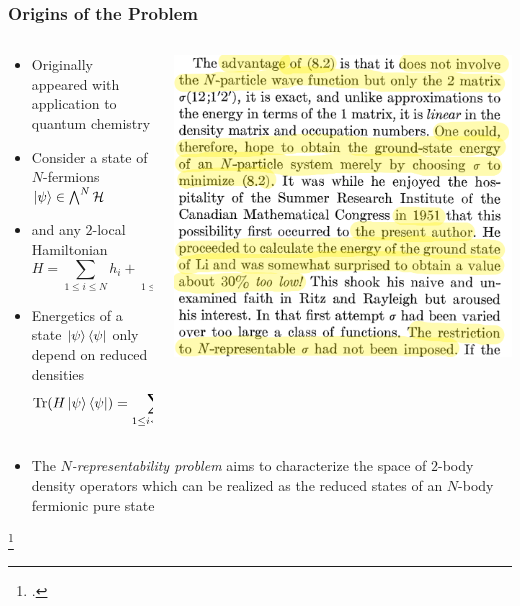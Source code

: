 \documentclass[
    9pt,
    hyperref={bookmarks=false, colorlinks=false}, %
    xcolor={dvipsnames},
]{beamer}
\DeclareMathOperator{\Tr}{Tr}
\begin{document}
\begin{frame}
    \frametitle{Origins of the Problem}
    \begin{columns}
        \begin{column}{0.6\textwidth}
            \begin{itemize}
                \item Originally appeared with application to quantum chemistry\footnotemark{}
                \item Consider a state of $N$-fermions $\ket{\psi} \in \bigwedge^N \mathcal H$
                \item and any $2$-local Hamiltonian
                    \[ H = \sum_{1 \leq i \leq N} h_i + \sum_{1 \leq i < j \leq N} h_{ij} \]
                \item Energetics of a state $\ket{\psi}\bra{\psi}$ only depend on reduced densities
                    \[ \Tr ( H \ket{\psi}\bra{\psi} ) = \sum_{1 \leq i < j \leq N} \Tr ( \tilde h_{ij} \rho_{ij} ) \]
            \end{itemize}
        \end{column}
        \begin{column}{0.4\textwidth}
            \begin{alertblock}{}
                \includegraphics[width=\textwidth]{figures/coleman.png}
                \hspace*{}
            \end{alertblock}
        \end{column}
    \end{columns}
    \begin{itemize}
        \item The \textit{$N$-representability problem} aims to characterize the space of $2$-body density operators which can be realized as the reduced states of an $N$-body fermionic pure state
    \end{itemize}
    \footcitetext{coleman1963structure}
\end{frame}
\end{document}

